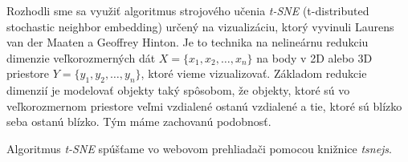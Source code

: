 Rozhodli sme sa využiť algoritmus strojového učenia \textit{t-SNE} (t-distributed
stochastic neighbor embedding) určený na vizualizáciu, ktorý
vyvinuli Laurens van der Maaten a Geoffrey Hinton. Je to technika na nelineárnu
redukciu dimenzie veľkorozmerných dát $X=\{x_1, x_2, \ldots, x_n\}$ na body v 2D alebo
3D priestore $Y=\{y_1, y_2, \ldots, y_n\}$, ktoré vieme vizualizovať.
Základom redukcie dimenzií je modelovať objekty taký spôsobom, že objekty, ktoré sú
vo veľkorozmernom priestore veľmi vzdialené ostanú vzdialené a tie, ktoré sú blízko
seba ostanú blízko. Tým máme zachovanú podobnosť.~\cite{bib:tsne}

Algoritmus \textit{t-SNE} spúšťame vo webovom prehliadači pomocou knižnice
\textit{tsnejs}.